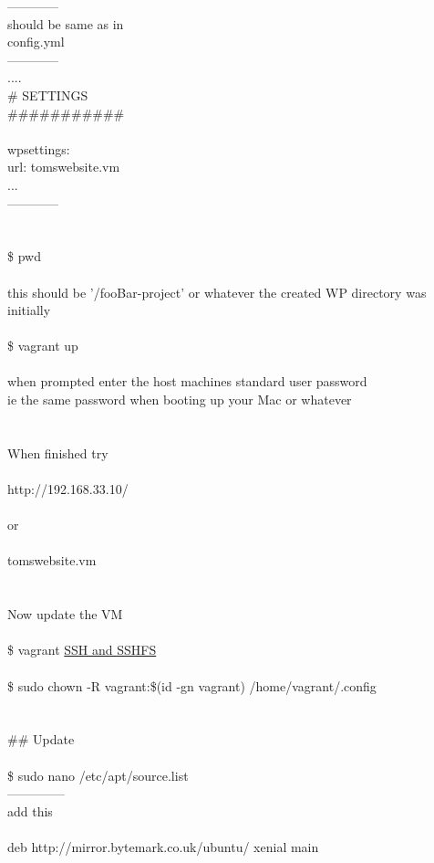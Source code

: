 \documentclass[10pt,a4paper]{article}
\begin{document}
{{{{{{{{{{{{{{{{{{{{{{{{------------\\
should be same as in\\
config.yml\\
------------\\
....\\
\# SETTINGS\\
\#\#\#\#\#\#\#\#\#\#\#\\
\\
wpsettings:\\
  url: tomswebsite.vm\\
 ...\\
------------\\
\\
\\
\$ pwd\\
\\
this should be '/fooBar-project' or whatever the created WP directory was initially\\
\\
\$ vagrant up\\
\\
when prompted enter the host machines standard user password\\
ie the same password when booting up your Mac or whatever\\
\\
\\
When finished try\\
\\
http://192.168.33.10/\\
\\
or\\
\\
tomswebsite.vm\\
\\
\\
Now update the VM\\
\\
\$ vagrant \hyperlink{ssh___and_sshfs}{SSH   and SSHFS}\\
\\
\$ sudo chown -R vagrant:\$(id -gn vagrant) /home/vagrant/.config \\
\\
\\
\#\# Update\\
\\
\$ sudo nano /etc/apt/source.list\\
--------------\\
add this\\
\\
	deb http://mirror.bytemark.co.uk/ubuntu/ xenial main \\
}}}}}}}}}}}}}}}}}}}}}}}}
\end{document}
